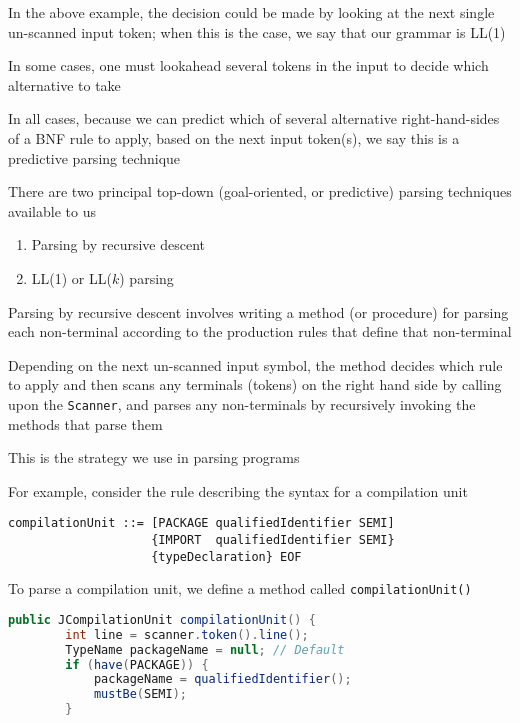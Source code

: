 \documentclass[8pt,a4paper,compress]{beamer}
\begin{document}
\begin{frame}[fragile]
\pause

In the above example, the decision could be made by looking at the next single un-scanned input token; when this is the case, we say that our grammar is LL(1)

\pause
\bigskip

In some cases, one must lookahead several tokens in the input to decide which alternative to take

\pause
\bigskip

In all cases, because we can predict which of several alternative right-hand-sides of a BNF rule to apply, based on the next input token(s), we say this is a predictive parsing technique

\pause
\bigskip

There are two principal top-down (goal-oriented, or predictive) parsing techniques available to us
\begin{enumerate}
\item Parsing by recursive descent
\item LL(1) or LL($k$) parsing
\end{enumerate}
\end{frame}

\begin{frame}[fragile]
\pause

Parsing by recursive descent involves writing a method (or procedure) for parsing each non-terminal according to the production rules that define that non-terminal

\pause
\bigskip

Depending on the next un-scanned input symbol, the method decides which rule to apply and then scans any terminals (tokens) on the right hand side by calling upon the \lstinline{Scanner}, and parses any non-terminals by recursively invoking the methods that parse them

\pause
\bigskip

This is the strategy we use in parsing \jmm programs

\pause
\bigskip

For example, consider the rule describing the syntax for a compilation unit
\begin{lstlisting}[language={}]
compilationUnit ::= [PACKAGE qualifiedIdentifier SEMI]
                    {IMPORT  qualifiedIdentifier SEMI}
                    {typeDeclaration} EOF 
\end{lstlisting}

\pause
\bigskip

To parse a compilation unit, we define a method called \lstinline{compilationUnit()}

\begin{lstlisting}[language=Java]
    public JCompilationUnit compilationUnit() {
        int line = scanner.token().line();
        TypeName packageName = null; // Default
        if (have(PACKAGE)) {
            packageName = qualifiedIdentifier();
            mustBe(SEMI);
        }
\end{lstlisting}
\end{frame}
\end{document}

